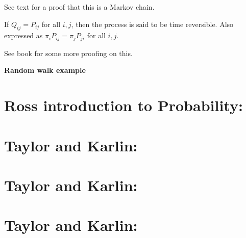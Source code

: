 \documentclass{article}
\begin{document}
See text for a proof that this is a Markov chain.

If $Q_{ij} = P_{ij}$ for all $i,j$, then the process is said to be
time reversible. Also expressed as $\pi_i P_{ij} = \pi_j P_{ji}$
for all $i,j$.

See book for some more proofing on this.

\textbf{Random walk example}



\subsection{}
\subsection{}

\setcounter{section}{5}
\section{Ross introduction to Probability:}
\setcounter{subsection}{4}
\subsection{}
\subsection{}
\subsection{}

\setcounter{section}{3}
\section{Taylor and Karlin:}
\setcounter{subsection}{7}
\subsection{}

\section{Taylor and Karlin:}
\setcounter{subsection}{3}
\subsection{}

\setcounter{section}{5}
\section{Taylor and Karlin:}
\subsection{}
\subsection{}
\subsection{}
\subsection{}
\end{document}
